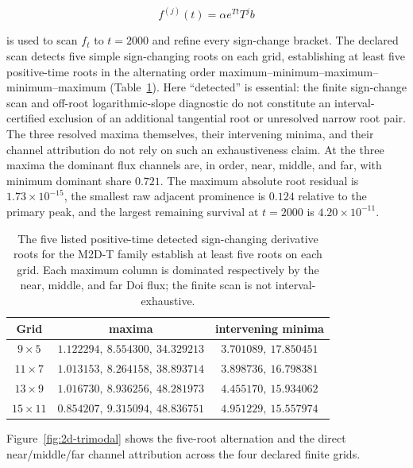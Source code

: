 \documentclass[aps,pre,reprint,amsmath,amssymb,longbibliography,floatfix]{revtex4-2}
\begin{document}
\begin{equation}
f^{(j)}(t)=\alpha e^{Tt}T^j b
\label{eq:2d-trimodal-derivatives}
\end{equation}

is used to scan $f_t$ to $t=2000$ and refine every sign-change bracket.
The declared scan detects five simple sign-changing roots on each grid,
establishing at least five positive-time roots in the alternating order
maximum--minimum--maximum--minimum--maximum (Table~\ref{tab:2d-trimodal}).
Here ``detected'' is essential: the finite sign-change scan and off-root
logarithmic-slope diagnostic do not constitute an interval-certified exclusion
of an additional tangential root or unresolved narrow root pair. The three
resolved maxima themselves, their intervening minima, and their channel
attribution do not rely on such an exhaustiveness claim.
At the three maxima the dominant flux channels are, in order, near, middle,
and far, with minimum dominant share $0.721$. The maximum absolute root
residual is $1.73\times10^{-15}$, the smallest raw adjacent prominence is
$0.124$ relative to the primary peak, and the largest remaining survival at
$t=2000$ is $4.20\times10^{-11}$.

\begin{table}[!t]
\caption{\label{tab:2d-trimodal}The five listed positive-time detected
sign-changing derivative roots for the M2D-T family establish at least five
roots on each grid. Each maximum column is dominated respectively by the near,
middle, and far Doi flux; the finite scan is not interval-exhaustive.}
\begin{ruledtabular}
\begin{tabular}{ccc}
Grid & maxima & intervening minima\\
\hline
$9\times5$ & $1.122294,\ 8.554300,\ 34.329213$ & $3.701089,\ 17.850451$\\
$11\times7$ & $1.013153,\ 8.264158,\ 38.893714$ & $3.898736,\ 16.798381$\\
$13\times9$ & $1.016730,\ 8.936256,\ 48.281973$ & $4.455170,\ 15.934062$\\
$15\times11$ & $0.854207,\ 9.315094,\ 48.836751$ & $4.951229,\ 15.557974$
\end{tabular}
\end{ruledtabular}
\end{table}

Figure~\ref{fig:2d-trimodal} shows the five-root alternation and the direct
near/middle/far channel attribution across the four declared finite grids.
\end{document}

